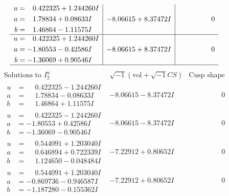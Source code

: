 \documentclass[1p]{elsarticle_modified}
\theoremstyle{definition}
\newcommand{\I}{\sqrt{-1}}
\begin{document}
$$\begin{array}{c|c|c}
\begin{aligned}
u &= \phantom{-}0.422325 + 1.244260 I \\
a &= \phantom{-}1.78834 + 0.08633 I \\
b &= \phantom{-}1.46864 - 1.11575 I\end{aligned}
 & -8.06615 + 8.37472 I & \phantom{-0.000000 } 0 \\ \hline\begin{aligned}
u &= \phantom{-}0.422325 + 1.244260 I \\
a &= -1.80553 - 0.42586 I \\
b &= -1.36069 + 0.90546 I\end{aligned}
 & -8.06615 + 8.37472 I & \phantom{-0.000000 } 0\\
 \hline 
 \end{array}$$\newpage$$\begin{array}{c|c|c}  
\text{Solutions to }I^u_{2}& \I (\text{vol} + \sqrt{-1}CS) & \text{Cusp shape}\\
 \hline 
\begin{aligned}
u &= \phantom{-}0.422325 - 1.244260 I \\
a &= \phantom{-}1.78834 - 0.08633 I \\
b &= \phantom{-}1.46864 + 1.11575 I\end{aligned}
 & -8.06615 - 8.37472 I & \phantom{-0.000000 } 0 \\ \hline\begin{aligned}
u &= \phantom{-}0.422325 - 1.244260 I \\
a &= -1.80553 + 0.42586 I \\
b &= -1.36069 - 0.90546 I\end{aligned}
 & -8.06615 - 8.37472 I & \phantom{-0.000000 } 0 \\ \hline\begin{aligned}
u &= \phantom{-}0.544091 + 1.203040 I \\
a &= \phantom{-}0.646894 + 0.722339 I \\
b &= \phantom{-}1.124650 - 0.048484 I\end{aligned}
 & -7.22912 + 0.80652 I & \phantom{-0.000000 } 0 \\ \hline\begin{aligned}
u &= \phantom{-}0.544091 + 1.203040 I \\
a &= -0.869736 - 0.946587 I \\
b &= -1.187280 - 0.155362 I\end{aligned}
 & -7.22912 + 0.80652 I & \phantom{-0.000000 } 0 \\ \hline\begin{aligned}

\end{aligned}
\end{array}$$
\end{document}
